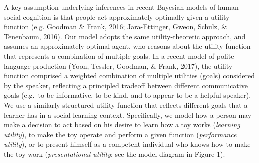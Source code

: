 \documentclass[10pt, letterpaper]{article}
\begin{document}
A key assumption underlying inferences in recent Bayesian models of
human social cognition is that people act approximately optimally given
a utility function (e.g. Goodman \& Frank, 2016; Jara-Ettinger, Gweon,
Schulz, \& Tenenbaum, 2016). Our model adopts the same utility-theoretic
approach, and assumes an approximately optimal agent, who reasons about
the utility function that represents a combination of multiple goals. In
a recent model of polite language production (Yoon, Tessler, Goodman, \&
Frank, 2017), the utility function comprised a weighted combination of
multiple utilities (goals) considered by the speaker, reflecting a
principled tradeoff between different communicative goals (e.g.~to be
informative, to be kind, and to appear to be a helpful speaker). We use
a similarly structured utility function that reflects different goals
that a learner has in a social learning context. Specifically, we model
how a person may make a decision to act based on his desire to learn how
a toy works (\emph{learning utility}), to make the toy operate and
perform a given function (\emph{performance utility}), or to present
himself as a competent individual who knows how to make the toy work
(\emph{presentational utility}; see the model diagram in Figure 1).
\end{document}
